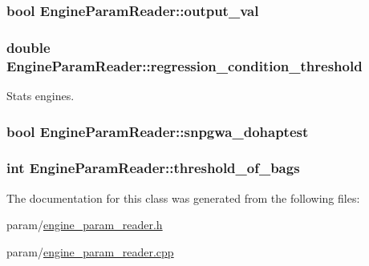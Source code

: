 \label{classEngineParamReader_ad5357c75728cd53b4d6927e1d119b8c3}
\hypertarget{classEngineParamReader_adfad9c1511ba0932828906285b9a022d}{
\subsubsection[{output\_\-val}]{\setlength{\rightskip}{0pt plus 5cm}bool {\bf EngineParamReader::output\_\-val}}}
\label{classEngineParamReader_adfad9c1511ba0932828906285b9a022d}
\hypertarget{classEngineParamReader_a3c9b1f9d8ed6b84647e3321faeadabfc}{
\subsubsection[{regression\_\-condition\_\-threshold}]{\setlength{\rightskip}{0pt plus 5cm}double {\bf EngineParamReader::regression\_\-condition\_\-threshold}}}
\label{classEngineParamReader_a3c9b1f9d8ed6b84647e3321faeadabfc}


Stats engines. 

\hypertarget{classEngineParamReader_ac782b98dc9c201d73458b3ae6c5a53e6}{
\subsubsection[{snpgwa\_\-dohaptest}]{\setlength{\rightskip}{0pt plus 5cm}bool {\bf EngineParamReader::snpgwa\_\-dohaptest}}}
\label{classEngineParamReader_ac782b98dc9c201d73458b3ae6c5a53e6}
\hypertarget{classEngineParamReader_ad071b31418cfeeb13b015064bf3714b0}{
\subsubsection[{threshold\_\-of\_\-bags}]{\setlength{\rightskip}{0pt plus 5cm}int {\bf EngineParamReader::threshold\_\-of\_\-bags}}}
\label{classEngineParamReader_ad071b31418cfeeb13b015064bf3714b0}


The documentation for this class was generated from the following files:\begin{DoxyCompactItemize}
\item 
param/\hyperlink{engine__param__reader_8h}{engine\_\-param\_\-reader.h}\item 
param/\hyperlink{engine__param__reader_8cpp}{engine\_\-param\_\-reader.cpp}\end{DoxyCompactItemize}
